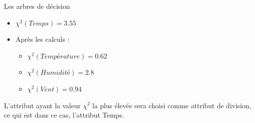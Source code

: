 \documentclass[a4paper, 11pt]{report}
\begin{document}
\begin{chapter}{Les arbres de décision}
\begin{itemize}
\begin{itemize}
\begin{itemize}
\begin{table}[!h]
\begin{small}
\begin{tabular}{cc}
    \begin{minipage}{.5\linewidth}
\begin{tabular}{| l | l | l |}
\hline
\cellcolor{gray!25} & \cellcolor{gray!25}Oui & \cellcolor{gray!25}Non\\
\hline
Ensoleillé & $\frac{5*9}{14} = 3.21$ & $\frac{5*5}{14} = 1.78$\\
\hline
Pluvieux & $\frac{5*9}{14} = 3.21$ & $\frac{5*5}{14} = 1.78$ \\
\hline
Couvert & $\frac{4*9}{14} = 2.57$ & $\frac{4*5}{14} = 1.43$  \\
\hline
\end{tabular} 
      \caption{Tableau d'estimation}
 
    \end{minipage} 
\end{tabular}
\end{small}
\end{table}

\item $\chi^2(Temps)= \frac{(2-3.21)^2}{3.21}+\frac{(3-1.78)^2}{1.78}+\frac{(3-3.21)^2}{3.21}+\frac{(2-1.78)^2}{1.78}+\frac{(4-2.57)^2}{2.57}+\frac{(0-1.43)^2}{1.43}$\\
\end{itemize}
\item $\chi^2(Temps) = 3.55$
\item Après les calculs :
\begin{itemize}
\item $\chi^2(Température) = 0.62$
\item $\chi^2(Humidité) = 2.8$
\item $\chi^2(Vent) = 0.94$
\end{itemize}
\end{itemize}
L'attribut ayant la valeur $\chi^2$ la plus élevée sera choisi comme attribut de division, ce qui est dans ce cas, l'attribut Temps. 

\end{itemize}




\end{chapter}
\end{document}
